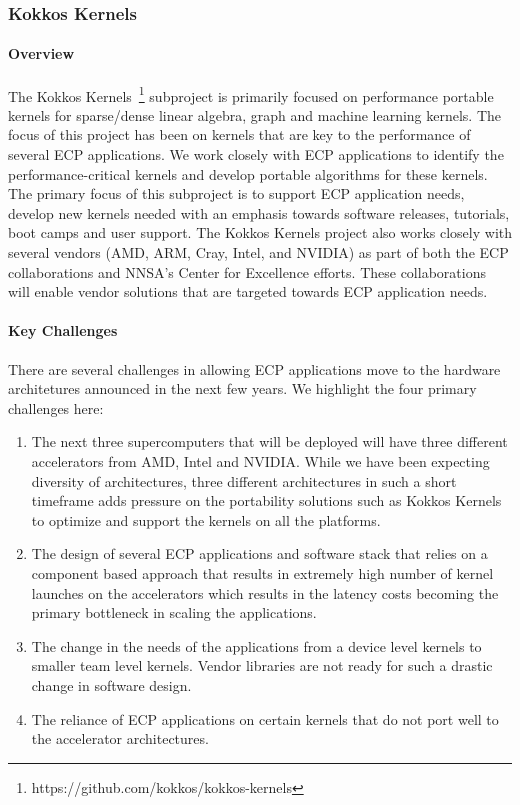 \subsubsection{ Kokkos Kernels} 
\paragraph{Overview} 
The Kokkos Kernels~\footnote{https://github.com/kokkos/kokkos-kernels} subproject is primarily focused on performance portable kernels
for sparse/dense linear algebra, graph and machine learning kernels. The
focus of this project has been on kernels that are key to the performance of
several ECP applications. We work closely with ECP applications to identify the
performance-critical kernels and develop portable algorithms for these kernels.
The primary focus of this subproject is to support ECP application needs, develop new
kernels needed with an emphasis towards software releases, tutorials, boot camps
and user support. The Kokkos Kernels project also works closely with several vendors
(AMD, ARM, Cray, Intel, and NVIDIA) as part of both the ECP collaborations and
NNSA's Center for Excellence efforts. These collaborations will  enable vendor solutions
that are targeted towards ECP application needs.

\paragraph{Key  Challenges}
There are several challenges in allowing ECP applications move to the hardware architetures
announced in the next few years. We highlight the four primary challenges here:
\begin{enumerate}
\item 
The next three supercomputers that will be deployed will have
three different accelerators from AMD, Intel and NVIDIA. While we have been expecting diversity of architectures, three
different architectures in such a short timeframe adds pressure on the portability
solutions such as Kokkos Kernels to optimize and support the kernels on all the platforms.
\item
The design of several ECP applications and software stack that relies on a component based
approach that results in extremely high number of kernel launches on the accelerators which
results in the latency costs becoming the primary bottleneck in scaling the applications.
\item
The change in the needs of the applications from a device level kernels to smaller team level kernels. Vendor
libraries are not ready for such a drastic change in software design.
\item 
The reliance of ECP applications on certain kernels that do not port well to the  accelerator architectures.
\end{enumerate}


